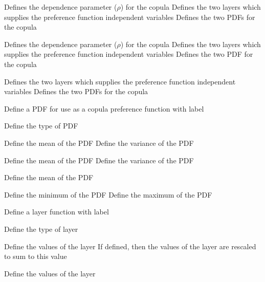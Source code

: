  {Defines the dependence parameter ($\rho$) for the copula}
 {Defines the two layers which supplies the preference function independent variables}
 {Defines the two PDFs for the copula}
\par\textbf{}\par
{} {Defines the dependence parameter ($\rho$) for the copula}
 {Defines the two layers which supplies the preference function independent variables}
 {Defines the two PDF for the copula}
\par\textbf{}\par
{} {Defines the two layers which supplies the preference function independent variables}
 {Defines the two PDFs for the copula}
\par{} {Define a PDF for use as a copula preference function with label}\par
{} {Define the type of PDF}
\par\textbf{}\par
{} {Define the mean of the PDF}
 {Define the variance of the PDF}
\par\textbf{}\par
{} {Define the mean of the PDF}
 {Define the variance of the PDF}
\par\textbf{}\par
{} {Define the mean of the PDF}
\par\textbf{}\par
{} {Define the minimum of the PDF}
 {Define the maximum of the PDF}
\par{} {Define a layer function with label}\par
{} {Define the type of layer}
\par\textbf{}\par
{} {Define the values of the layer}
 {If defined, then the values of the layer are rescaled to sum to this value}
\par\textbf{}\par
{} {Define the values of the layer}
